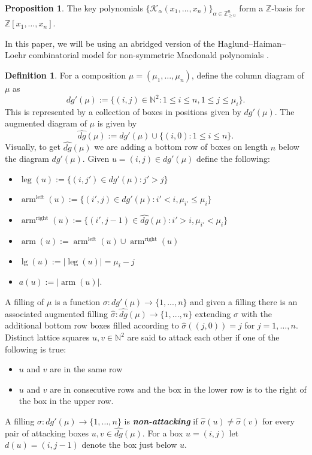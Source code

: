 \documentclass[12pt,reqno]{amsart}
\theoremstyle{definition}
\newtheorem{prop}[thm]{Proposition}
\newtheorem{defn}[thm]{Definition}
\DeclareMathOperator{\mathleft}{left}
\DeclareMathOperator{\mathright}{right}
\DeclareMathOperator{\arm}{arm}
\DeclareMathOperator{\leg}{leg}
\DeclareMathOperator{\mathleg}{lg}
\begin{document}
\begin{prop}\cite{RS95}\label{key polys are basis}
    The key polynomials $\{\mathcal{K}_{\alpha}(x_1,\ldots, x_n) \}_{\alpha \in \mathbb{Z}_{\geq 0}^{n}}$ form a $\mathbb{Z}$-basis for $\mathbb{Z}[x_1,\ldots,x_n].$
\end{prop}

 In this paper, we will be using an abridged version of the Haglund--Haiman--Loehr combinatorial model for non-symmetric Macdonald polynomials \cite{haglund2007combinatorial}. 

\begin{defn}\cite{haglund2007combinatorial} \label{HHL defn}
For a composition $\mu = (\mu_1,\dots,\mu_n)$, define the column diagram of $\mu$ as 
$$dg'(\mu):= \{(i,j)\in \mathbb{N}^2 : 1\leq i\leq n, 1\leq j \leq \mu_i \}.$$ This is represented by a collection of boxes in positions given by $dg'(\mu)$. The augmented diagram of $\mu$ is given by 
$$\widehat{dg}(\mu):= dg'(\mu)\cup\{(i,0): 1\leq i\leq n\}.$$
Visually, to get $\widehat{dg}(\mu)$ we are adding a bottom row of boxes on length $n$ below the diagram $dg'(\mu)$. Given $u = (i,j) \in dg'(\mu)$ define the following:
\begin{itemize}
    \item $\leg(u) := \{(i,j') \in dg'(\mu): j' > j\}$
    \item $\arm^{\mathleft}(u) := \{(i',j) \in dg'(\mu): i'<i, \mu_{i'} \leq \mu_i\} $
    \item $\arm^{\mathright}(u):= \{(i',j-1) \in \widehat{dg}(\mu): i'>i, \mu_{i'}<\mu_{i}\}$
    \item $\arm(u) := \arm^{\mathleft}(u) \cup \arm^{\mathright}(u)$
    \item $\mathleg(u):= |\leg(u)| = \mu_i -j$
    \item $a(u) := |\arm(u)|.$
\end{itemize}
A filling of $\mu$ is a function $\sigma: dg'(\mu) \rightarrow \{1,...,n\}$ and given a filling there is an associated augmented filling $\widehat{\sigma}: \widehat{dg}(\mu) \rightarrow \{1,...,n\}$ extending $\sigma$ with the additional bottom row boxes filled according to $\widehat{\sigma}((j,0)) = j$ for $j = 1,\dots,n$. Distinct lattice squares $u,v \in \mathbb{N}^2$ are said to attack each other if one of the following is true:
\begin{itemize}
\item $u$ and $v$ are in the same row 
\item $u$ and $v$ are in consecutive rows and the box in the lower row is to the right of the box in the upper row.
\end{itemize}
A filling $\sigma: dg'(\mu) \rightarrow \{1,\dots,n\}$ is \textbf{\textit{non-attacking}} if $\widehat{\sigma}(u) \neq \widehat{\sigma}(v)$ for every pair of attacking boxes $u,v \in \widehat{dg}(\mu).$
For a box $u= (i,j)$ let $d(u) = (i,j-1)$ denote the box just below $u$.
\end{defn}
\end{document}
